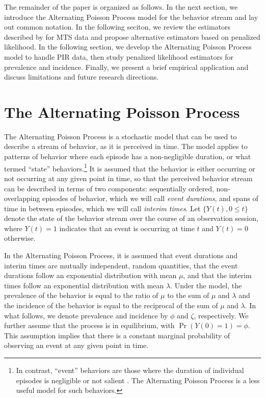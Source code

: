 \documentclass[man, noextraspace, floatsintext]{apa6}\usepackage[]{graphicx}\usepackage[]{color}
\begin{document}

The remainder of the paper is organized as follows. In the next section, we introduce the Alternating Poisson Process model for the behavior stream and lay out common notation. In the following seciton, we review the estimators described by \citet{Brown1977estimation} for MTS data and propose alternative estimators based on penalized likelihood. In the following section, we develop the Alternating Poisson Process model to handle PIR data, then study penalized likelihood estimators for prevalence and incidence. Finally, we present a brief empirical application and discuss limitations and future research directions.

\section{The Alternating Poisson Process}
\label{sec:APP}

The Alternating Poisson Process is a stochastic model that can be used to describe a stream of behavior, as it is perceived in time. The model applies to patterns of behavior where each episode has a non-negligible duration, or what \citet{Altmann1974observational} termed ``state'' behaviors.\footnote{In contrast, ``event'' behaviors are those where the duration of individual episodes is negligible or not salient \citep{Altmann1974observational}. The Alternating Poisson Process is a less useful model for such behaviors.} It is assumed that the behavior is either occurring or not occurring at any given point in time, so that the perceived behavior stream can be described in terms of two components: sequentially ordered, non-overlapping episodes of behavior, which we will call \textit{event durations}, and spans of time in between episodes, which we will call \textit{interim times}. Let $\{Y(t), 0 \leq t\}$ denote the state of the behavior stream over the course of an observation session, where $Y(t) = 1$ indicates that an event is occurring at time $t$ and $Y(t) = 0$ otherwise.

In the Alternating Poisson Process, it is assumed that event durations and interim times are mutually independent, random quantities, that the event durations follow an exponential distribution with mean $\mu$, and that the interim times follow an exponential distribution with mean $\lambda$.  Under the model, the prevalence of the behavior is equal to the ratio of $\mu$ to the sum of $\mu$ and $\lambda$ and the incidence of the behavior is equal to the reciprocal of the sum of $\mu$ and $\lambda$. In what follows, we denote prevalence and incidence by $\phi$ and $\zeta$, respectively. We further assume that the process is in equilibrium, with $\Pr\left(Y(0) = 1\right) = \phi$. This assumption implies that there is a constant marginal probability of observing an event at any given point in time.
\end{document}
